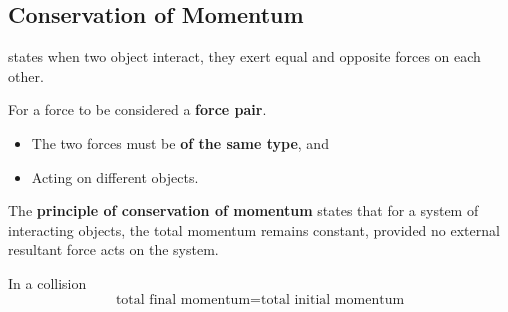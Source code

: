 \subsection{Conservation of Momentum}

 states when two object interact, they exert equal and opposite forces on each other.

For a force to be considered a \textbf{force pair}.
\begin{itemize}
    \item The two forces must be \textbf{of the same type}, and
    \item Acting on different objects.
\end{itemize}

The \textbf{principle of conservation of momentum} states that for a system of interacting objects, the total momentum remains constant, provided no external resultant force acts on the system.

In a collision
$$\text{total final momentum}=\text{total initial momentum}$$
